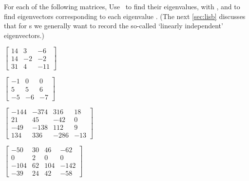 \begin{exercise}  
For each of the following matrices, Use \script\ to find their eigenvalues, with , and to find eigenvectors corresponding to each eigenvalue \twodp.  
(The next \cref{sec:lisb} discusses that for s we generally want to record the so-called `linearly independent' eigenvectors.)
\begin{Parts}
\item \(\begin{bmatrix} 14 & 3 & -6
\\14 & -2 & -2
\\31 & 4 & -11 \end{bmatrix}\)
\setbox\ajrqrbox\hbox{}\marginajrbox%

\item \(\begin{bmatrix} -1 & 0 & 0
\\5 & 5 & 6
\\-5 & -6 & -7 \end{bmatrix}\)
\setbox\ajrqrbox\hbox{}\marginajrbox%

\item \(\begin{bmatrix} -144 & -374 & 316 & 18
\\21 & 45 & -42 & 0
\\-49 & -138 & 112 & 9
\\134 & 336 & -286 & -13 \end{bmatrix}\)
\setbox\ajrqrbox\hbox{}\marginajrbox%

\begin{OmitV1}
\item \(\begin{bmatrix} -50 & 30 & 46 & -62
\\0 & 2 & 0 & 0
\\-104 & 62 & 104 & -142
\\-39 & 24 & 42 & -58 \end{bmatrix}\)
\setbox\ajrqrbox\hbox{}\marginajrbox%


\end{OmitV1}
\end{Parts}
\end{exercise}
